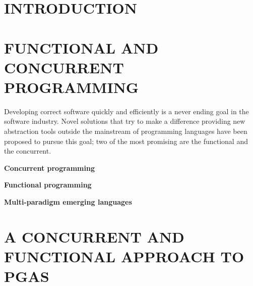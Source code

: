 \documentclass[a4paper,10pt,twoside, top=3.3cm,
bottom=4.2cm, left=2.6cm, right=2.6cm]{article}
\newcommand{\simpleEntry}[1]{
\vspace{.3cm}
\noindent \textbf{#1}
\vspace{.3cm}
}
\begin{document}
\onecolumn \maketitle \normalsize \vfill

\section{\uppercase{Introduction}}
\label{sec:intro}
    

\section{\uppercase{Functional and concurrent programming}}
\label{sec:stateArt}
\noindent Developing correct software quickly and efficiently is a never ending goal in the software industry. Novel solutions that try to make a difference providing new abstraction tools outside the mainstream of programming languages have been proposed to pursue this goal; two of the most promising are the functional and the concurrent.





\simpleEntry{Concurrent programming}
    

\simpleEntry{Functional programming}
    

\simpleEntry{Multi-paradigm emerging languages} %
    

\section{\uppercase{A concurrent and functional approach to pGAs}}
\label{sec:design}
    
\end{document}
